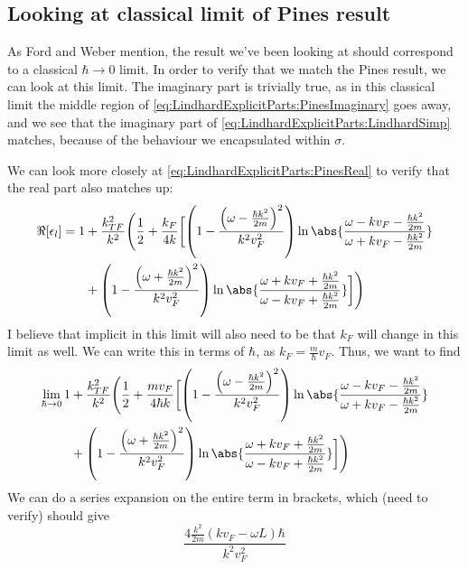 \documentclass[../../main.tex]{subfiles}
\newcommand{\vf}{v_F}
\begin{document}
\subsection{Looking at classical limit of Pines result}
As Ford and Weber mention, the result we've been looking at should correspond to a classical $\hbar\rightarrow 0$ limit.  In order to verify that we match the Pines result, we can look at this limit. The imaginary part is trivially true, as in this classical limit the middle region of \eqref{eq:LindhardExplicitParts:PinesImaginary} goes away, and we see that the imaginary part of \eqref{eq:LindhardExplicitParts:LindhardSimp} matches, because of the behaviour we encapsulated within $\sigma$.

We can look more closely at \eqref{eq:LindhardExplicitParts:PinesReal} to verify that the real part also matches up:
\begin{align}
	\Re[\epsilon_l]	= 1 &+ \frac{k_{TF}^2}{k^2} \Biggl(
		\frac12 + \frac{k_F}{4k} \biggl[
			\left( 1 - \frac{\left(\omega - \frac{\hbar k^2}{2m} \right)^2}{k^2\vf^2} \right) \ln\abs{\frac{\omega - k \vf - \frac{\hbar k^2}{2m}}{\omega + k \vf - \frac{\hbar k^2}{2m}}} \nonumber \\
			&+ \left(1 - \frac{\left(\omega + \frac{\hbar k^2}{2m} \right)^2}{k^2 \vf^2} \right) \ln\abs{\frac{\omega + k\vf + \frac{\hbar k^2}{2m}}{\omega - k \vf + \frac{\hbar k^2}{2m}}}
		\biggr]
	 \Biggr)
\end{align}
I believe that implicit in this limit will also need to be that $k_F$ will change in this limit as well. We can write this in terms of $\hbar$, as $k_F = \frac{m}{\hbar} \vf$. Thus, we want to find
\begin{align}
	\lim_{\hbar \rightarrow 0} 1 &+ \frac{k_{TF}^2}{k^2} \Biggl(
		\frac12 + \frac{m \vf}{4 \hbar k} \biggl[
			\left( 1 - \frac{\left(\omega - \frac{\hbar k^2}{2m} \right)^2}{k^2\vf^2} \right) \ln\abs{\frac{\omega - k \vf - \frac{\hbar k^2}{2m}}{\omega + k \vf - \frac{\hbar k^2}{2m}}} \nonumber \\
			&+ \left(1 - \frac{\left(\omega + \frac{\hbar k^2}{2m} \right)^2}{k^2 \vf^2} \right) \ln\abs{\frac{\omega + k\vf + \frac{\hbar k^2}{2m}}{\omega - k \vf + \frac{\hbar k^2}{2m}}}
		\biggr]
	 \Biggr)
\end{align}
We can do a series expansion on the entire term in brackets, which (need to verify) should give
\begin{equation}
	\frac{4 \frac{k^2}{2m} \left(k \vf - \omega L \right)\hbar}{k^2 \vf^2}
\end{equation}
\end{document}

